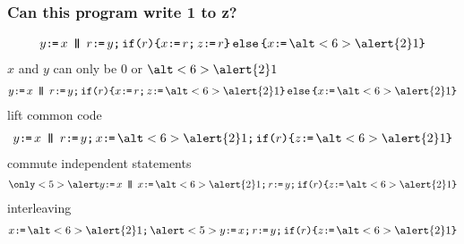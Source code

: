 \documentclass[t,aspectratio=169]{beamer} %
\begin{document}
\begin{frame}
  \frametitle{Can this program write 1 to z?}  
  \vspace{-2\baselineskip}
  \begin{gather*}
    y\GETS x
    \PAR
    r\GETS y\SEMI
    \IF{r}\THEN x\GETS r\SEMI z\GETS r \ELSE x\GETS\alt<6>{\alert{2}}{1} \FI
  \end{gather*}
  \pause
  $x$ and $y$ can only be $0$ or $\alt<6>{\alert{2}}{1}$  
  \begin{gather*}
    y\GETS x
    \PAR
    r\GETS y\SEMI
    \IF{r}\THEN x\GETS r\SEMI z\GETS \alt<6>{\alert{2}}{1} \ELSE x\GETS\alt<6>{\alert{2}}{1} \FI
  \end{gather*}
  \pause
  lift common code
  \begin{gather*}
    y\GETS x
    \PAR
    r\GETS y\SEMI
    x\GETS\alt<6>{\alert{2}}{1}\SEMI
    \IF{r}\THEN z\GETS \alt<6>{\alert{2}}{1} \FI
  \end{gather*}
  \pause
  commute independent statements
  \begin{gather*}
    \only<5>{\alert}{y\GETS x}
    \PAR
    x\GETS\alt<6>{\alert{2}}{1}\SEMI
    r\GETS y\SEMI
    \IF{r}\THEN z\GETS \alt<6>{\alert{2}}{1} \FI
  \end{gather*}
  \pause
  interleaving
  \begin{gather*}
    x\GETS\alt<6>{\alert{2}}{1}\SEMI
    \alert<5>{y\GETS x}\SEMI
    r\GETS y\SEMI
    \IF{r}\THEN z\GETS \alt<6>{\alert{2}}{1} \FI
  \end{gather*}
\end{frame}


\end{document}
